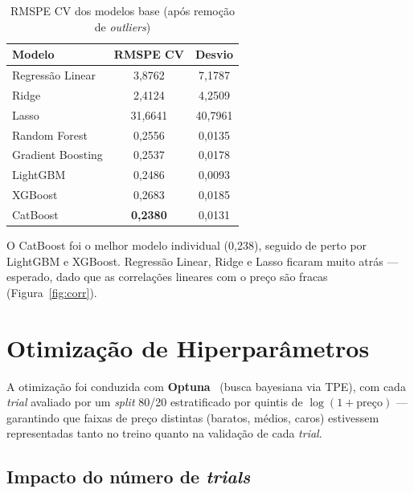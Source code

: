 \documentclass[12pt, a4paper]{article}
\begin{document}
\begin{table}[H]
  \centering
  \caption{RMSPE CV dos modelos base (após remoção de \textit{outliers})}
  \label{tab:baselines}
  \small{}
  \begin{tabular}{lcc}
    \toprule
    \rowcolor{headerblue}
    \color{white}\textbf{Modelo} & \color{white}\textbf{RMSPE CV} & \color{white}\textbf{Desvio} \\
    \midrule
    Regressão Linear                          & 3,8762 & 7,1787 \\
    Ridge                                     & 2,4124 & 4,2509 \\
    Lasso                                     & 31,6641 & 40,7961 \\
    Random Forest~\cite{ref:breiman}          & 0,2556 & 0,0135 \\
    Gradient Boosting                         & 0,2537 & 0,0178 \\
    LightGBM~\cite{ref:lgbm}                  & 0,2486 & 0,0093 \\
    XGBoost~\cite{ref:xgb}                    & 0,2683 & 0,0185 \\
    CatBoost~\cite{ref:catboost}              & \textbf{0,2380} & 0,0131 \\
    \bottomrule
  \end{tabular}
\end{table}

O CatBoost foi o melhor modelo individual (0,238), seguido de perto por LightGBM e XGBoost. Regressão Linear, Ridge e Lasso ficaram muito atrás --- esperado, dado que as correlações lineares com o preço são fracas (Figura~\ref{fig:corr}).

\section{Otimização de Hiperparâmetros}

A otimização foi conduzida com \textbf{Optuna}~\cite{ref:optuna} (busca bayesiana via TPE), com cada \textit{trial} avaliado por um \textit{split} 80/20 estratificado por quintis de $\log(1+\text{preço})$ --- garantindo que faixas de preço distintas (baratos, médios, caros) estivessem representadas tanto no treino quanto na validação de cada \textit{trial}.

\subsection{Impacto do número de \textit{trials}}
\end{document}
